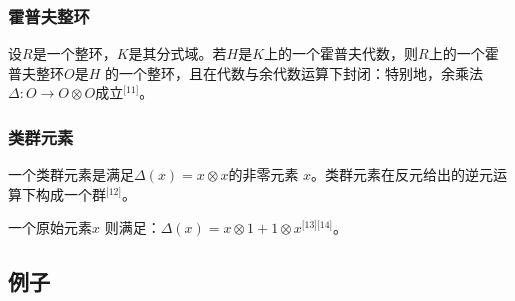 \subsubsection{霍普夫整环}
设$R$是一个整环，$K$是其分式域。若$H$是$K$上的一个霍普夫代数，则$R$上的一个霍普夫整环$O$是$H$ 的一个整环，且在代数与余代数运算下封闭：特别地，余乘法$\Delta : O \to O \otimes O$成立\(^\text{[11]}\)。
\subsubsection{类群元素}
一个类群元素是满足$\Delta(x) = x \otimes x$的非零元素 $x$。类群元素在反元给出的逆元运算下构成一个群\(^\text{[12]}\)。

一个原始元素$x$ 则满足：$\Delta(x) = x \otimes 1 + 1 \otimes x$\(^\text{[13][14]}\)。 
\subsection{例子}
